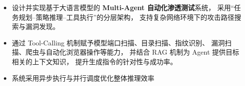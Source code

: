 \documentclass{resume}
\begin{document}
\begin{itemize}
  \item 设计并实现基于大语言模型的\textbf{ Multi-Agent 自动化渗透测试}系统，
  采用“任务规划–策略推理–工具执行”的分层架构，
  支持复杂网络环境下的攻击路径搜索与漏洞发现。

  \item 通过 Tool-Calling 机制赋予模型端口扫描、目录扫描、指纹识别、
  漏洞扫描、爬虫与自动化浏览器操作等能力，
  并结合 RAG 机制为 Agent 提供目标相关的上下文知识，
  提升生成指令的针对性与成功率。

  \item 系统采用异步执行与并行调度优化整体推理效率
\end{itemize}




\end{document}
